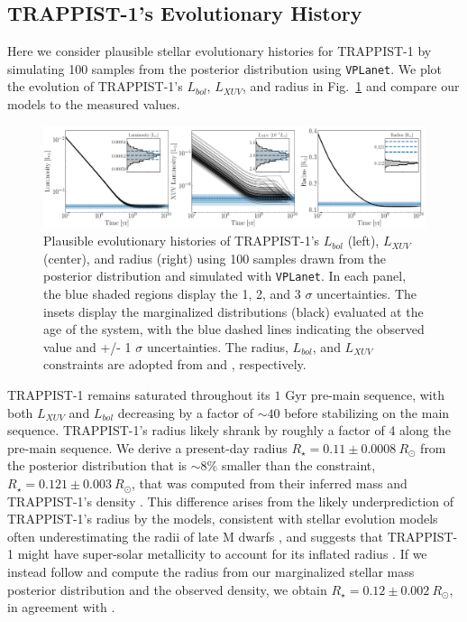 \documentclass[twocolumn]{aastex62}
\newcommand{\vplanet}[0]{\texttt{VPLanet}\xspace}
\begin{document}
\subsection{TRAPPIST-1's Evolutionary History}

Here we consider plausible stellar evolutionary histories for TRAPPIST-1 by simulating 100 samples from the posterior distribution using \vplanet. We plot the evolution of TRAPPIST-1's $L_{bol}$, $L_{XUV}$, and radius in Fig.~\ref{fig:evol} and compare our models to the measured values. 

\begin{figure}[t]
	\includegraphics[width=\textwidth]{../Analysis/Evol/trappist1Evol.pdf}
   \caption{Plausible evolutionary histories of TRAPPIST-1's $L_{bol}$ (left), $L_{XUV}$ (center), and radius (right) using 100 samples drawn from the posterior distribution and simulated with \vplanet. In each panel, the blue shaded regions display the 1, 2, and 3 $\sigma$ uncertainties. The insets display the marginalized distributions (black) evaluated at the age of the system, with the blue dashed lines indicating the observed value and +/- 1 $\sigma$ uncertainties. The radius, $L_{bol}$, and $L_{XUV}$ constraints are adopted from \citet{vanGrootel2018} and \citet{Wheatley2017}, respectively.}%
    \label{fig:evol}%
\end{figure}

TRAPPIST-1 remains saturated throughout its $1$ Gyr pre-main sequence, with both $L_{XUV}$ and $L_{bol}$ decreasing by a factor of ${\sim}40$ before stabilizing on the main sequence. TRAPPIST-1's radius likely shrank by roughly a factor of 4 along the pre-main sequence. We derive a present-day radius $R_{\star} = 0.11 \pm{0.0008} \ R_{\odot}$ from the posterior distribution that is ${\sim} 8\%$ smaller than the \citet{vanGrootel2018} constraint, $R_{\star} = 0.121 \pm {0.003} \ R_{\odot}$, that was computed from their inferred mass and TRAPPIST-1's density \citep{Delrez2018}. This difference arises from the likely underprediction of TRAPPIST-1's radius by the \citet{Baraffe2015} models, consistent with stellar evolution models often underestimating the radii of late M dwarfs \citep{Reid2005,Spada2013,Jackson2019}, and suggests that TRAPPIST-1 might have super-solar metallicity to account for its inflated radius \citep{Burgasser2017,vanGrootel2018}. If we instead follow \citet{vanGrootel2018} and compute the radius from our marginalized stellar mass posterior distribution and the \citet{Delrez2018} observed density, we obtain $R_{\star} = 0.12 \pm{0.002} \ R_{\odot}$, in agreement with \citet{vanGrootel2018}.
\end{document}
